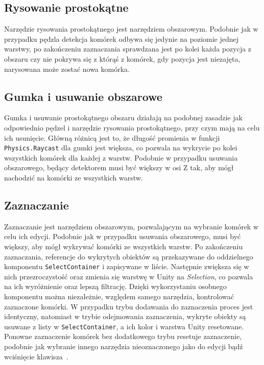 %

\subsection{Rysowanie prostokątne}
\label{subsec:rysowanie_prostokatne}

Narzędzie rysowania prostokątnego jest narzędziem obszarowym.
Podobnie jak w przypadku pędzla detekcja komórek odbywa się jedynie na poziomie jednej warstwy,
po zakończeniu zaznaczania sprawdzana jest po kolei każda pozycja z obszaru czy nie pokrywa się z którąś z komórek,
gdy pozycja jest niezajęta, narysowana może zostać nowa komórka.

\subsection{Gumka i usuwanie obszarowe}
\label{subsec:gumka_i_usuwanie_obszarowe}

Gumka i usuwanie prostokątnego obszaru działają na podobnej zasadzie jak odpowiednio pędzel
i narzędzie rysowania prostokątnego, przy czym mają na celu ich usunięcie.
Główną różnicą jest to, że długość promienia w funkcji \texttt{Physics.Raycast} dla gumki jest większa,
co pozwala na wykrycie po kolei wszystkich komórek dla każdej z warstw.
Podobnie w przypadku usuwania obszarowego,
 będący detektorem musi być większy w osi Z tak, aby mógł nachodzić na komórki ze wszystkich warstw.

\subsection{Zaznaczanie}
\label{subsec:zaznaczanie}

Zaznaczanie jest narzędziem obszarowym, pozwalającym na wybranie komórek w celu ich edycji.
Podobnie jak w przypadku usuwania obszarowego,  musi być większy,
aby mógł wykrywać komórki ze wszystkich warstw.
Po zakończeniu zaznaczania,
referencje do wykrytych obiektów są przekazywane do oddzielnego komponentu \texttt{SelectContainer}
i zapisywane w liście.
Następnie zwiększa się w nich przezroczystość oraz zmienia się warstwę w Unity na \textit{Selection},
co pozwala na ich wyróżnienie oraz lepszą filtrację.
Dzięki wykorzystaniu osobnego komponentu można niezależnie,
względem samego narzędzia,
kontrolować zaznaczone komórki.
W przypadku trybu dodawania do zaznaczenia proces jest identyczny,
natomiast w trybie odejmowania zaznaczenia,
wykryte obiekty są usuwane z listy w \texttt{SelectContainer}, a ich kolor i warstwa Unity resetowane.
Ponowne zaznaczenie komórek bez dodatkowego trybu resetuje zaznaczenie,
podobnie jak wybranie innego narzędzia nieoznaczonego jako do edycji bądź wciśnięcie klawisza~.

